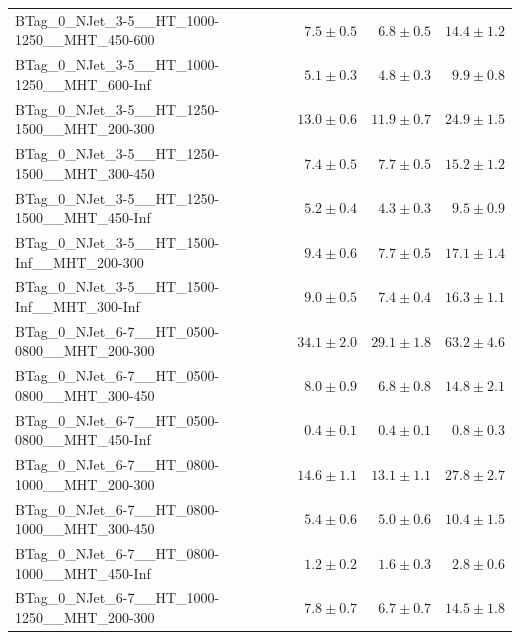 \documentclass{beamer}
\begin{document}
\begin{frame}
\begin{tabular}{lrrr}
      BTag\_0\_NJet\_3-5\_\_HT\_1000-1250\_\_MHT\_450-600 &               $7.5\pm0.5$&               $6.8\pm0.5$&                  $14.4\pm1.2$ \\ 
      BTag\_0\_NJet\_3-5\_\_HT\_1000-1250\_\_MHT\_600-Inf &               $5.1\pm0.3$&               $4.8\pm0.3$&                   $9.9\pm0.8$ \\ 
      BTag\_0\_NJet\_3-5\_\_HT\_1250-1500\_\_MHT\_200-300 &              $13.0\pm0.6$&              $11.9\pm0.7$&                  $24.9\pm1.5$ \\ 
      BTag\_0\_NJet\_3-5\_\_HT\_1250-1500\_\_MHT\_300-450 &               $7.4\pm0.5$&               $7.7\pm0.5$&                  $15.2\pm1.2$ \\ 
      BTag\_0\_NJet\_3-5\_\_HT\_1250-1500\_\_MHT\_450-Inf &               $5.2\pm0.4$&               $4.3\pm0.3$&                   $9.5\pm0.9$ \\ 
       BTag\_0\_NJet\_3-5\_\_HT\_1500-Inf\_\_MHT\_200-300 &               $9.4\pm0.6$&               $7.7\pm0.5$&                  $17.1\pm1.4$ \\ 
       BTag\_0\_NJet\_3-5\_\_HT\_1500-Inf\_\_MHT\_300-Inf &               $9.0\pm0.5$&               $7.4\pm0.4$&                  $16.3\pm1.1$ \\ 
      BTag\_0\_NJet\_6-7\_\_HT\_0500-0800\_\_MHT\_200-300 &              $34.1\pm2.0$&              $29.1\pm1.8$&                  $63.2\pm4.6$ \\ 
      BTag\_0\_NJet\_6-7\_\_HT\_0500-0800\_\_MHT\_300-450 &               $8.0\pm0.9$&               $6.8\pm0.8$&                  $14.8\pm2.1$ \\ 
      BTag\_0\_NJet\_6-7\_\_HT\_0500-0800\_\_MHT\_450-Inf &               $0.4\pm0.1$&               $0.4\pm0.1$&                   $0.8\pm0.3$ \\ 
      BTag\_0\_NJet\_6-7\_\_HT\_0800-1000\_\_MHT\_200-300 &              $14.6\pm1.1$&              $13.1\pm1.1$&                  $27.8\pm2.7$ \\ 
      BTag\_0\_NJet\_6-7\_\_HT\_0800-1000\_\_MHT\_300-450 &               $5.4\pm0.6$&               $5.0\pm0.6$&                  $10.4\pm1.5$ \\ 
      BTag\_0\_NJet\_6-7\_\_HT\_0800-1000\_\_MHT\_450-Inf &               $1.2\pm0.2$&               $1.6\pm0.3$&                   $2.8\pm0.6$ \\ 
      BTag\_0\_NJet\_6-7\_\_HT\_1000-1250\_\_MHT\_200-300 &               $7.8\pm0.7$&               $6.7\pm0.7$&                  $14.5\pm1.8$ \\ 

\end{tabular}
\end{frame}
\end{document}
